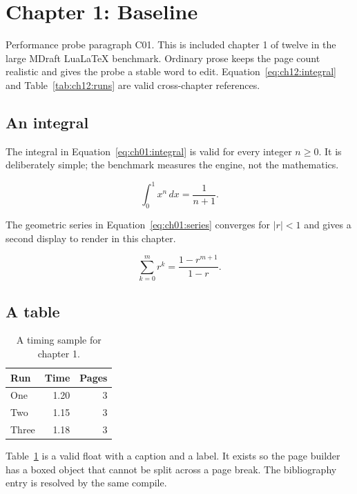 \section{Chapter 1: Baseline}
\label{sec:ch01}

Performance probe paragraph C01. This is included chapter 1 of twelve in
the large MDraft LuaLaTeX benchmark. Ordinary prose keeps the page count
realistic and gives the probe a stable word to edit. Equation~\ref{eq:ch12:integral} and
Table~\ref{tab:ch12:runs} are valid cross-chapter references.

\subsection{An integral}
The integral in Equation~\ref{eq:ch01:integral} is valid for every integer
$n \ge 0$. It is deliberately simple; the benchmark measures the engine, not
the mathematics.

\begin{equation}
  \label{eq:ch01:integral}
  \int_{0}^{1} x^{n}\,dx = \frac{1}{n+1}.
\end{equation}

The geometric series in Equation~\ref{eq:ch01:series} converges for
$|r| < 1$ and gives a second display to render in this chapter.

\begin{equation}
  \label{eq:ch01:series}
  \sum_{k=0}^{m} r^{k} = \frac{1-r^{m+1}}{1-r}.
\end{equation}

\subsection{A table}
\begin{table}[h]
  \centering
  \begin{tabular}{lrr}
    \toprule
    Run & Time & Pages \\
    \midrule
    One   & 1.20 & 3 \\
    Two   & 1.15 & 3 \\
    Three & 1.18 & 3 \\
    \bottomrule
  \end{tabular}
  \caption{A timing sample for chapter 1.}
  \label{tab:ch01:runs}
\end{table}

Table~\ref{tab:ch01:runs} is a valid float with a caption and a label. It
exists so the page builder has a boxed object that cannot be split across a
page break. The bibliography entry \cite{knuth1984} is resolved by the same compile.

